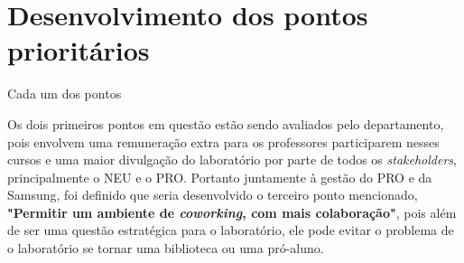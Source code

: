 \section{Desenvolvimento dos pontos prioritários}

Cada um dos pontos 

Os dois primeiros pontos em questão estão sendo avaliados pelo departamento, pois envolvem uma remuneração extra para os professores participarem nesses cursos e uma maior divulgação do laboratório por parte de todos os \textit{stakeholders}, principalmente o NEU e o PRO. Portanto juntamente à gestão do PRO e da Samsung, foi definido que seria desenvolvido o terceiro ponto mencionado, \textbf{"Permitir um ambiente de \textit{coworking}, com mais colaboração"}, pois além de ser uma questão estratégica para o laboratório, ele pode evitar o problema de o laboratório se tornar uma biblioteca ou uma pró-aluno.
